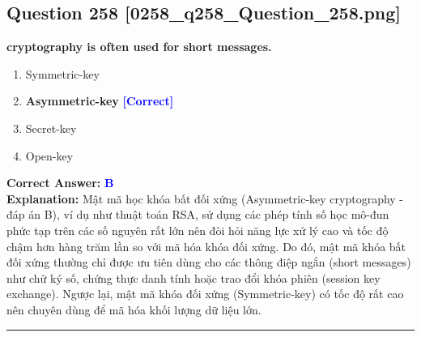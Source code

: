 \documentclass[11pt,a4paper]{article}
\begin{document}
\begin{minipage}{\textwidth}
\subsection*{Question 258 \quad \footnotesize{[0258\_q258\_Question\_258.png]}}
\noindent \textbf{cryptography is often used for short messages.}

\begin{enumerate}[label=\Alph*.]
    \item Symmetric-key
    \item \textbf{Asymmetric-key} \hfill \textcolor{blue}{\textbf{[Correct]}}
    \item Secret-key
    \item Open-key
\end{enumerate}

\noindent \textbf{Correct Answer:} \textcolor{blue}{\textbf{B}} \\[2pt]
\noindent \textbf{Explanation:} Mật mã học khóa bất đối xứng (Asymmetric-key cryptography - đáp án B), ví dụ như thuật toán RSA, sử dụng các phép tính số học mô-đun phức tạp trên các số nguyên rất lớn nên đòi hỏi năng lực xử lý cao và tốc độ chậm hơn hàng trăm lần so với mã hóa khóa đối xứng. Do đó, mật mã khóa bất đối xứng thường chỉ được ưu tiên dùng cho các thông điệp ngắn (short messages) như chữ ký số, chứng thực danh tính hoặc trao đổi khóa phiên (session key exchange). Ngược lại, mật mã khóa đối xứng (Symmetric-key) có tốc độ rất cao nên chuyên dùng để mã hóa khối lượng dữ liệu lớn.

\par\vspace{0.3cm}
\hrule
\vspace{0.3cm}
\end{minipage}
\end{document}
